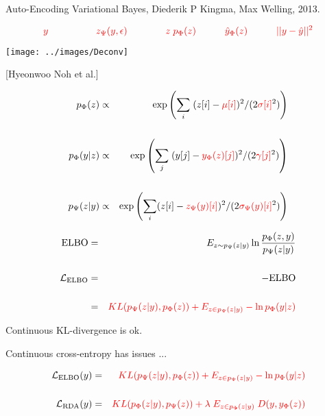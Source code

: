 {

Auto-Encoding Variational Bayes, Diederik P Kingma, Max Welling, 2013.

\vfill
$${\color{red}y \hspace{5em}  z_\Psi(y,\epsilon) \hspace{4em} z\;p_\Phi(z) \hspace{3em} \hat{y}_\Phi(z) \hspace{3em}||y - \hat{y}||^2}$$
\centerline{\texttt{[image: ../images/Deconv]}}

\centerline{\Large [Hyeonwoo Noh et al.]}


\begin{eqnarray*}
p_\Phi(z) & \propto & \exp\left(\sum_i \;(z[i] - {\color{red} \mu[i]})^2/(2{\color{red} \sigma[i]}^2)\right) \\
\\
p_\Phi(y|z) & \propto & \exp\left(\sum_j\;(y[j] - {\color{red} y_\Phi(z)[j]})^2/(2{\color{red} \gamma[j]}^2)\right) \\
\\
p_\Psi(z|y) & \propto & \exp\left(\sum_i (z[i] - {\color{red} z_\Psi(y)[i]})^2/(2{\color{red} \sigma_\Psi(y)[i]}^2)\right)
\end{eqnarray*}


\begin{eqnarray*}
\mathrm{ELBO} & = & E_{z \sim p_\Psi(z|y)} \ln \frac{p_\Phi(z,y)}{p_\Psi(z|y)} \\
\\
{\cal L}_{\mathrm{ELBO}} & = & - \mathrm{ELBO} \\
\\
& = & {\color{red}  KL(p_\Psi(z|y),p_\Phi(z)) + E_{z \in p_\Psi(z|y)} - \ln p_\Phi(y|z)}
\end{eqnarray*}

\vfill
Continuous KL-divergence is ok.

\vfill
Continuous cross-entropy has issues ...


\begin{eqnarray*}
{\cal L}_{\mathrm{ELBO}}(y) & = & {\color{red}  KL(p_\Psi(z|y),p_\Phi(z)) + E_{z \in p_\Psi(z|y)} - \ln p_\Phi(y|z)} \\
\\
{\cal L}_{\mathrm{RDA}}(y) & = & {\color{red}  KL(p_\Phi(z|y),p_\Psi(z)) + \lambda \; E_{z \in p_\Phi(z|y)}\; D(y,y_\Phi(z))}
\end{eqnarray*}

}

